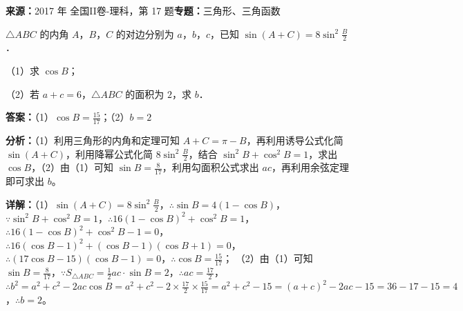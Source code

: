 \begin{question}[points=12]
\textbf{来源：}2017 年 全国II卷-理科，第 17 题\quad \textbf{专题：}三角形、三角函数\par
$\triangle ABC$ 的内角 $A$，$B$，$C$ 的对边分别为 $a$，$b$，$c$，已知 $\sin(A+C)=8\sin^2\frac{B}{2}$．

（1）求 $\cos B$；

（2）若 $a+c=6$，$\triangle ABC$ 的面积为 $2$，求 $b$．
\begin{solution}
\textbf{答案：}（1）$\cos B=\frac{15}{17}$；（2）$b=2$

\textbf{分析：}（1）利用三角形的内角和定理可知 $A+C=\pi-B$，再利用诱导公式化简 $\sin(A+C)$，利用降幂公式化简 $8\sin^2\frac{B}{2}$，结合 $\sin^2B+\cos^2B=1$，求出 $\cos B$，（2）由（1）可知 $\sin B=\frac{8}{17}$，利用勾面积公式求出 $ac$，再利用余弦定理即可求出 $b$。

\textbf{详解：}（1）$\sin(A+C)=8\sin^2\frac{B}{2}$，$\therefore\sin B=4(1-\cos B)$，$\because\sin^2B+\cos^2B=1$，$\therefore16(1-\cos B)^2+\cos^2B=1$，$\therefore16(1-\cos B)^2+\cos^2B-1=0$，$\therefore16(\cos B-1)^2+(\cos B-1)(\cos B+1)=0$，$\therefore(17\cos B-15)(\cos B-1)=0$，$\therefore\cos B=\frac{15}{17}$；
（2）由（1）可知 $\sin B=\frac{8}{17}$，$\because S_{\triangle ABC}=\frac{1}{2}ac\cdot\sin B=2$，$\therefore ac=\frac{17}{2}$，$\therefore b^2=a^2+c^2-2ac\cos B=a^2+c^2-2\times\frac{17}{2}\times\frac{15}{17}=a^2+c^2-15=(a+c)^2-2ac-15=36-17-15=4$，$\therefore b=2$。
\end{solution}
\end{question}


